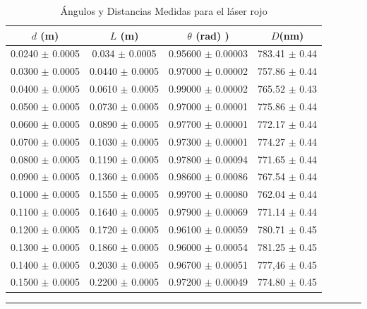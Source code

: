 \documentclass[10pt,a4paper]{article}
\begin{document}
	\begin{table}[H]
		\centering
		\begin{tabular}{|c|c|c|c|}
			\hline
			$d$ (m) & $L$ (m) & $\theta$ (rad) )&  $D$(nm) \\ \hline
			0.0240 $\pm$ 0.0005  & 0.034 $\pm$ 0.0005 &  0.95600 $\pm$ 0.00003  & 783.41 $\pm$ 0.44 \\
			0.0300 $\pm$ 0.0005  & 0.0440 $\pm$ 0.0005 &  0.97000 $\pm$ 0.00002 & 757.86 $\pm$ 0.44\\
			0.0400 $\pm$ 0.0005  & 0.0610 $\pm$ 0.0005 &  0.99000 $\pm$ 0.00002 & 765.52 $\pm$ 0.43 \\ 
			0.0500 $\pm$ 0.0005 & 0.0730 $\pm$ 0.0005 & 0.97000 $\pm$ 0.00001 & 775.86 $\pm$ 0.44\\ 
			0.0600 $\pm$ 0.0005 & 0.0890 $\pm$ 0.0005 & 0.97700 $\pm$ 0.00001 &  772.17 $\pm$ 0.44\\ 
			0.0700 $\pm$ 0.0005 & 0.1030 $\pm$ 0.0005 & 0.97300 $\pm$ 0.00001 & 774.27 $\pm$ 0.44\\
			0.0800 $\pm$ 0.0005  & 0.1190 $\pm$ 0.0005 &  0.97800 $\pm$ 0.00094 & 771.65 $\pm$ 0.44 \\ 
			0.0900 $\pm$ 0.0005 & 0.1360 $\pm$ 0.0005 &  0.98600 $\pm$ 0.00086 & 767.54 $\pm$ 0.44 \\
			0.1000 $\pm$ 0.0005 & 0.1550 $\pm$ 0.0005 &  0.99700 $\pm$ 0.00080 & 762.04 $\pm$ 0.44  \\
			0.1100 $\pm$ 0.0005 & 0.1640 $\pm$ 0.0005 &  0.97900 $\pm$ 0.00069 & 771.14 $\pm$ 0.44 \\
			0.1200 $\pm$ 0.0005 & 0.1720 $\pm$ 0.0005 &  0.96100 $\pm$ 0.00059 & 780.71 $\pm$ 0.45 \\
			0.1300 $\pm$ 0.0005 & 0.1860 $\pm$ 0.0005 &  0.96000 $\pm$ 0.00054 & 781.25 $\pm$ 0.45 \\
			0.1400 $\pm$ 0.0005 & 0.2030 $\pm$ 0.0005 &  0.96700 $\pm$ 0.00051 & 777,46 $\pm$ 0.45  \\
			0.1500 $\pm$ 0.0005 & 0.2200 $\pm$ 0.0005 &  0.97200 $\pm$ 0.00049 & 774.80 $\pm$ 0.45  \\ \hline
			
		\end{tabular}
		\caption{Ángulos y Distancias Medidas para el láser rojo}
		\label{tab:angulos_distancias.}
		\rule{100mm}{0.1mm}
	\end{table}
	
\end{document}
